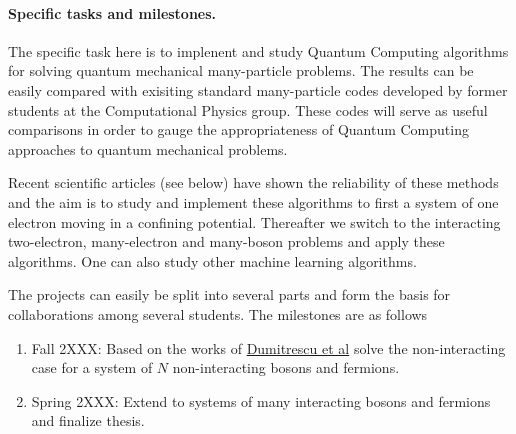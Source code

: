 \documentclass[%
oneside,                 %
final,                   %
10pt]{article}
\begin{document}
\paragraph{Specific tasks and milestones.}
The specific task here is to implenent and study Quantum Computing algorithms 
for solving quantum mechanical many-particle
problems. The results can  be easily compared with exisiting standard
many-particle codes developed by former students at the Computational
Physics group. These codes will serve as useful comparisons in order
to gauge the appropriateness of Quantum Computing  approaches to
quantum mechanical problems.

Recent scientific articles (see below) have shown the reliability of these methods and
the aim is to study and implement these algorithms to first a system
of one electron moving in a confining potential. Thereafter we switch
to the interacting two-electron, many-electron and many-boson problems and apply
these algorithms.  One can also study other machine learning algorithms. 


The projects can easily be split into several parts and form the basis for collaborations among several students. The milestones are as follows
\begin{enumerate}
\item Fall 2XXX: Based on the works of \href{{https://arxiv.org/abs/1801.03897}}{Dumitrescu et al} solve the non-interacting case for a system of $N$ non-interacting bosons and fermions.

\item Spring 2XXX: Extend to systems of many interacting bosons and fermions and finalize thesis.
\end{enumerate}

\noindent

\end{document}
